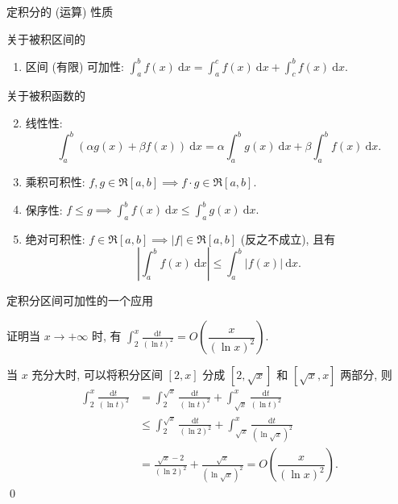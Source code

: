 \begin{frame}{定积分的 (运算) 性质}

关于被积区间的
\pause
\begin{enumerate}
\item 区间 (有限) 可加性: $\int_a^b f(x) ~ \mathrm{d} x = \int_a^c f(x) ~ \mathrm{d} x + \int_c^b f(x) ~ \mathrm{d} x.$
\end{enumerate}

\pause

关于被积函数的
\pause
\begin{enumerate}[<+->]
\setcounter{enumi}{1}
\item 线性性:
\[\int_a^b (\alpha g(x) + \beta f(x)) ~ \mathrm{d} x = \alpha \int_a^b g(x) ~ \mathrm{d} x + \beta \int_a^b f(x) ~ \mathrm{d} x.\]
\item 乘积可积性: $f, g \in \mathfrak{R}[a, b] \implies f \cdot g \in \mathfrak{R}[a, b].$
\item 保序性: $f \leqslant g \implies \int_a^b f(x) ~ \mathrm{d} x \leqslant \int_a^b g(x) ~ \mathrm{d} x.$
\item 绝对可积性: $f \in \mathfrak{R}[a, b] \implies \lvert f \rvert \in \mathfrak{R}[a, b]$ ({\color{red}反之不成立}), 且有
\[\left\lvert \int_a^b f(x) ~ \mathrm{d} x \right\rvert \leqslant \int_a^b \lvert f(x) \rvert ~ \mathrm{d} x.\]
\end{enumerate}

\end{frame}


\begin{frame}{定积分区间可加性的一个应用}

\begin{eg}
证明当 $x \to +\infty$ 时, 有 $\int_2^x \frac{\mathrm{d} t}{(\ln t)^2} = O\left(\dfrac{x}{(\ln x)^2}\right).$
\end{eg}

\pause
\vspace{1em}

\startproof[bg=yellow, fg=red]
当 $x$ 充分大时, 可以将积分区间 $[2, x]$ 分成 $[2, \sqrt{x}]$ 和 $[\sqrt{x}, x]$ 两部分, 则
\begin{align*}
\int_2^x \frac{\mathrm{d} t}{(\ln t)^2} & = \int_2^{\sqrt{x}} \frac{\mathrm{d} t}{(\ln t)^2} + \int_{\sqrt{x}}^x \frac{\mathrm{d} t}{(\ln t)^2} \\
& \leqslant \int_2^{\sqrt{x}} \frac{\mathrm{d} t}{(\ln 2)^2} + \int_{\sqrt{x}}^x \frac{\mathrm{d} t}{(\ln \sqrt{x})^2} \\
& = \frac{\sqrt{x}-2}{(\ln 2)^2} + \frac{\sqrt{x}}{(\ln \sqrt{x})^2} = O\left(\dfrac{x}{(\ln x)^2}\right).
\end{align*}
\qed

\end{frame}

